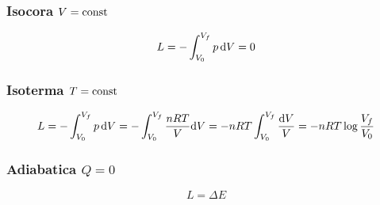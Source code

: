 \subsubsection{Isocora $V=\text{const}$}
\begin{equation}
   L=-\int_{V_0}^{V_f} p\,\mathrm{d} V=0
\end{equation}
\subsubsection{Isoterma $T=\text{const}$}
\begin{equation}
   L=-\int_{V_0}^{V_f} p\,\mathrm{d} V=-\int_{V_0}^{V_f} \frac{nRT}{V}\mathrm{d} V=-nRT\int_{V_0}^{V_f} \frac{\mathrm{d} V}{V}=-nRT\log\frac{V_f}{V_0}
\end{equation}
\subsubsection{Adiabatica $Q=0$}
\begin{equation}
   L=\Delta E
\end{equation}
